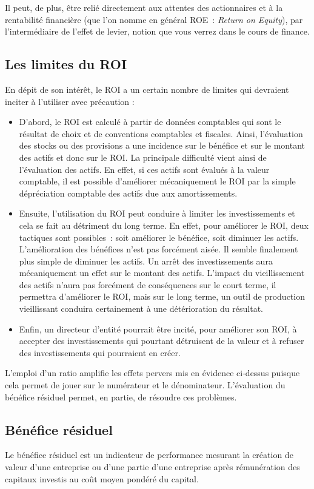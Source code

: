 \documentclass[oneside]{kaobook}
\begin{document}
Il peut, de plus, être relié directement aux attentes des actionnaires et à la rentabilité financière (que l'on nomme en général ROE : \emph{Return on Equity}), par l'intermédiaire de l'effet de levier, notion que vous verrez dans le cours de finance.
\subsection{Les limites du ROI}
\label{sec:orge38c94e}
En dépit de son intérêt, le ROI a un certain nombre de limites qui devraient inciter à l'utiliser avec précaution : 
\begin{itemize}
\item D'abord, le ROI est calculé à partir de données comptables qui sont le résultat de choix et de conventions comptables et fiscales. Ainsi, l'évaluation des stocks ou des provisions a une incidence sur le bénéfice et sur le montant des actifs et donc sur le ROI. La principale difficulté vient ainsi de l'évaluation des actifs. En effet, si ces actifs sont évalués à la valeur comptable, il est possible d'améliorer mécaniquement le ROI par la simple dépréciation comptable des actifs due aux amortissements.
\item Ensuite, l'utilisation du ROI peut conduire à limiter les investissements et cela se fait au détriment du long terme. En effet, pour améliorer le ROI, deux tactiques sont possibles : soit améliorer le bénéfice, soit diminuer les actifs. L'amélioration des bénéfices n'est pas forcément aisée. Il semble finalement plus simple de diminuer les actifs. Un arrêt des investissements aura mécaniquement un effet sur le montant des actifs. L'impact du vieillissement des actifs n'aura pas forcément de conséquences sur le court terme, il permettra d'améliorer le ROI, mais sur le long terme, un outil de production vieillissant conduira certainement à une détérioration du résultat.
\item Enfin, un directeur d'entité pourrait être incité, pour améliorer son ROI, à accepter des investissements qui pourtant détruisent de la valeur et à refuser des investissements qui pourraient en créer.
\end{itemize}

L'emploi d'un ratio amplifie les effets pervers mis en évidence ci-dessus puisque cela permet de jouer sur le numérateur et le dénominateur. L'évaluation du bénéfice résiduel permet, en partie, de résoudre ces problèmes. 
\subsection{Bénéfice résiduel}
\label{sec:orgb9d8e25}
Le bénéfice résiduel est un indicateur de performance mesurant la création de valeur d'une entreprise ou d'une partie d'une entreprise après rémunération des capitaux investis au coût moyen pondéré du capital. 
\end{document}
